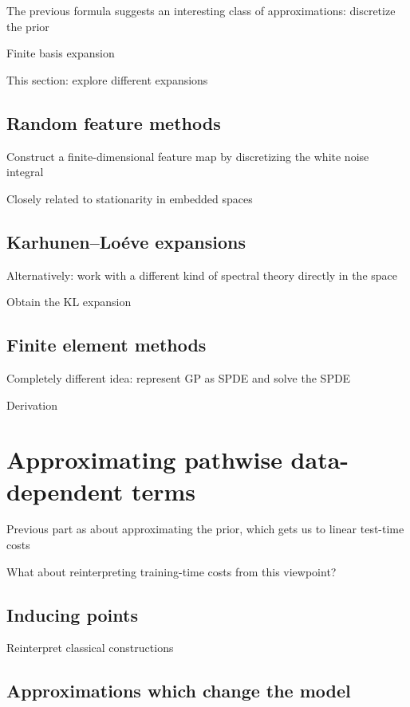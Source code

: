 \documentclass[11pt]{book}
\begin{document}
The previous formula suggests an interesting class of approximations: discretize the prior

Finite basis expansion

This section: explore different expansions

\subsection{Random feature methods}

Construct a finite-dimensional feature map by discretizing the white noise integral

Closely related to stationarity in embedded spaces

\subsection{Karhunen--Loéve expansions}

Alternatively: work with a different kind of spectral theory directly in the space

Obtain the KL expansion

\subsection{Finite element methods}

Completely different idea: represent GP as SPDE and solve the SPDE

Derivation

\section{Approximating pathwise data-dependent terms}

Previous part as about approximating the prior, which gets us to linear test-time costs

What about reinterpreting training-time costs from this viewpoint?

\subsection{Inducing points}

Reinterpret classical constructions

\subsection{Approximations which change the model}
\end{document}

